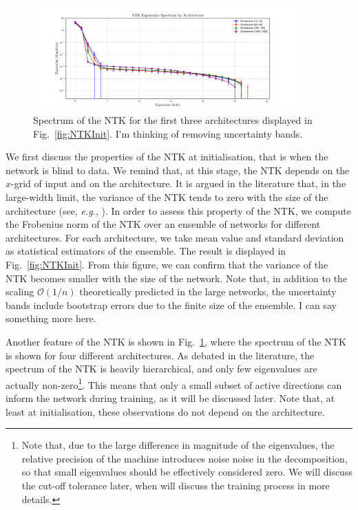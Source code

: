 \begin{figure}[t!]
  \centering
  \includegraphics[width=0.90\textwidth]{plots/ntk_eigenvalue_spectrum.pdf}
  \caption{Spectrum of the NTK for the first three architectures displayed in
  Fig.~\ref{fig:NTKInit}. \ac{I'm thinking of removing uncertainty bands.}}
  \label{fig:NTKSpectrum}
\end{figure}
We first discuss the properties of the NTK at initialisation, that is when the
network is blind to data. We remind that, at this stage, the NTK depends on
the $x$-grid of input and on the architecture. It is argued in the literature
that, in the large-width limit, the variance of the NTK tends to zero with the
size of the architecture (see, \textit{e.g.}, \cite{Roberts:2021fes}). In order
to assess this property of the NTK, we compute the Frobenius norm of the NTK
over an ensemble of networks for different architectures. For each architecture,
we take mean value and standard deviation as statistical estimators of the
ensemble. The result is displayed in Fig.~\ref{fig:NTKInit}. From this figure,
we can confirm that the variance of the NTK becomes smaller with the size of the
network. Note that, in addition to the scaling $\mathcal{O}(1/n)$ theoretically
predicted in the large networks, the uncertainty bands include bootstrap errors
due to the finite size of the ensemble. \ac{I can say something more here.}

Another feature of the NTK is shown in Fig.~\ref{fig:NTKSpectrum}, where the
spectrum of the NTK is shown for four different architectures. As debated in the
literature, the spectrum of the NTK is heavily hierarchical, and only few
eigenvalues are actually non-zero\footnote{Note that, due to the large
difference in magnitude of the eigenvalues, the relative precision of the
machine introduces noise noise in the decomposition, so that small eigenvalues
should be effectively considered zero. We will discuss the cut-off tolerance
later, when will discuss the training process in more details.}. This means that
only a small subset of active directions can inform the network during training,
as it will be discussed later. Note that, at least at initialisation, these
observations do not depend on the architecture.

